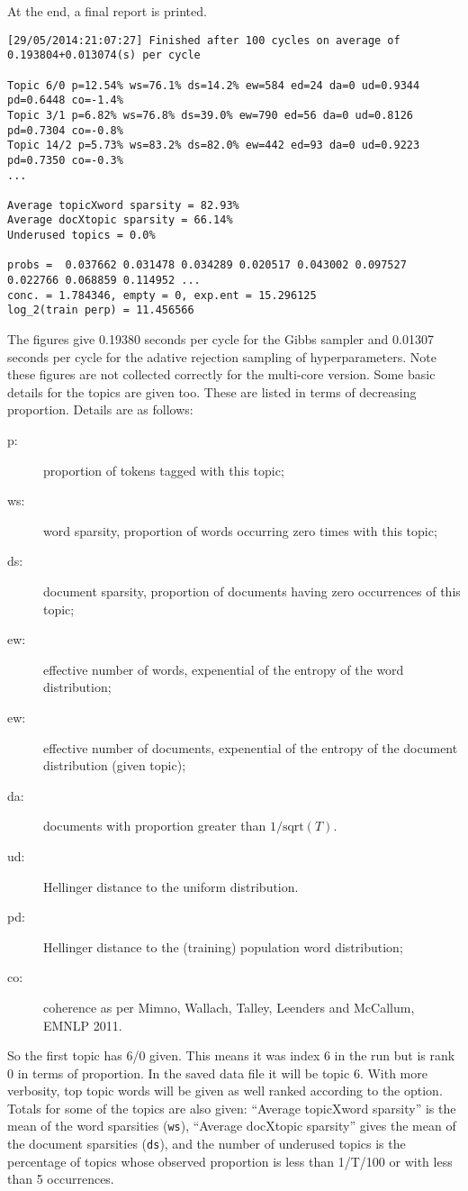 \documentclass[a4paper,english]{article}
\begin{document}
At the end, a final report is printed.  
\begin{verbatim}
[29/05/2014:21:07:27] Finished after 100 cycles on average of 0.193804+0.013074(s) per cycle

Topic 6/0 p=12.54% ws=76.1% ds=14.2% ew=584 ed=24 da=0 ud=0.9344 pd=0.6448 co=-1.4%
Topic 3/1 p=6.82% ws=76.8% ds=39.0% ew=790 ed=56 da=0 ud=0.8126 pd=0.7304 co=-0.8%
Topic 14/2 p=5.73% ws=83.2% ds=82.0% ew=442 ed=93 da=0 ud=0.9223 pd=0.7350 co=-0.3%
...

Average topicXword sparsity = 82.93%
Average docXtopic sparsity = 66.14%
Underused topics = 0.0%

probs =  0.037662 0.031478 0.034289 0.020517 0.043002 0.097527 0.022766 0.068859 0.114952 ...
conc. = 1.784346, empty = 0, exp.ent = 15.296125
log_2(train perp) = 11.456566
\end{verbatim}
The figures give 0.19380 seconds per cycle for the Gibbs sampler
and 0.01307 seconds per cycle for the adative rejection sampling
of hyperparameters.  Note these figures are not collected
correctly for the multi-core version.
Some basic details for the topics are given too.
These are listed in terms of decreasing proportion.
Details are as follows:
\begin{description}
\item[p:] proportion of tokens tagged with this topic;
\item[ws:] word sparsity, proportion of words occurring zero times with this topic;
\item[ds:] document sparsity, proportion of documents having zero occurrences of this topic;
\item[ew:] effective number of words, expenential of the entropy of the word distribution;
\item[ew:] effective number of documents, expenential of the entropy of the document distribution (given topic);
\item[da:] documents with proportion greater than $1/\mbox{sqrt}(T)$.
\item[ud:] Hellinger distance to the uniform distribution.
\item[pd:] Hellinger distance to the (training) population word distribution;
\item[co:] coherence as per Mimno, Wallach, Talley, Leenders and McCallum, EMNLP 2011.
\end{description}
So the first topic has 6/0 given.  This means it was index 6 in the
run but is rank 0 in terms of proportion.  In the saved data file
it will be topic 6.  With more verbosity, top topic words will be given
as well ranked according to the  option.
Totals for some of the topics are also given:
``Average topicXword sparsity'' is the mean of the word sparsities
(\texttt{ws}),  ``Average docXtopic sparsity''
gives the mean of the document sparsities (\texttt{ds}),
and the number of underused topics is the
percentage of topics whose observed proportion
is less than 1/T/100 or with less than 5 occurrences.
\end{document}
